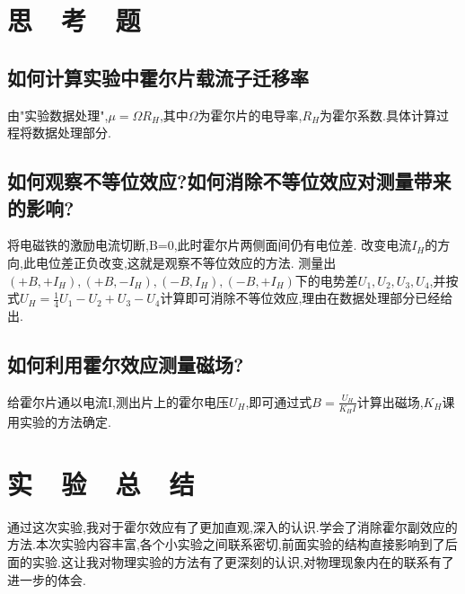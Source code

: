 \documentclass{thuemp}
\begin{document}
\section{思~~考~~题}

\subsection{如何计算实验中霍尔片载流子迁移率}
由"实验数据处理",$\mu=\Omega R_{H}$,其中$\Omega$为霍尔片的电导率,$R_{H}$为霍尔系数.具体计算过程将数据处理部分.
\subsection{如何观察不等位效应?如何消除不等位效应对测量带来的影响?}
将电磁铁的激励电流切断,B=0,此时霍尔片两侧面间仍有电位差.
改变电流$I_{H}$的方向,此电位差正负改变,这就是观察不等位效应的方法.
测量出$(+B,+I_{H}),(+B,-I_{H}),(-B,I_{H}),(-B,+I_{H})$下的电势差$U_{1},U_{2},U_{3},U_{4}$,并按式$U_{H}=\frac{1}{4}U_{1}-U_{2}+U_{3}-U_{4}$计算即可消除不等位效应,理由在数据处理部分已经给出.
\subsection{如何利用霍尔效应测量磁场?}
给霍尔片通以电流I,测出片上的霍尔电压$U_{H}$,即可通过式$ B=\frac{U_{H}}{K_{H}I} $计算出磁场,$K_{H}$课用实验的方法确定.
\section{实~~验~~总~~结}
通过这次实验,我对于霍尔效应有了更加直观,深入的认识.学会了消除霍尔副效应的方法.本次实验内容丰富,各个小实验之间联系密切,前面实验的结构直接影响到了后面的实验.这让我对物理实验的方法有了更深刻的认识,对物理现象内在的联系有了进一步的体会.

\renewcommand\refname{\heiti\wuhao\centerline{参考文献}\global\def\refname{参考文献}}
\vskip 12pt

\let\OLDthebibliography\thebibliography
\renewcommand\thebibliography[1]{
  \OLDthebibliography{#1}
  \setlength{\parskip}{0pt}
  \setlength{\itemsep}{0pt plus 0.3ex}
}

{
\renewcommand{\baselinestretch}{0.9}
\liuhao


}
\end{document}
